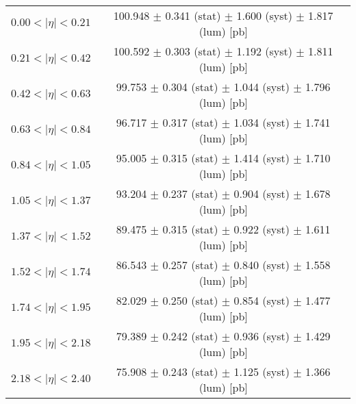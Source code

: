 \begin{tabular}{lc}
\hline
$0.00 < |\eta| <0.21$          & 100.948 $\pm$ 0.341 (stat) $\pm$ 1.600 (syst) $\pm$ 1.817 (lum) [pb]  \\
$0.21 < |\eta| <0.42$          & 100.592 $\pm$ 0.303 (stat) $\pm$ 1.192 (syst) $\pm$ 1.811 (lum) [pb]  \\
$0.42 < |\eta| <0.63$          & 99.753 $\pm$ 0.304 (stat) $\pm$ 1.044 (syst) $\pm$ 1.796 (lum) [pb]  \\
$0.63 < |\eta| <0.84$          & 96.717 $\pm$ 0.317 (stat) $\pm$ 1.034 (syst) $\pm$ 1.741 (lum) [pb]  \\
$0.84 < |\eta| <1.05$          & 95.005 $\pm$ 0.315 (stat) $\pm$ 1.414 (syst) $\pm$ 1.710 (lum) [pb]  \\
$1.05 < |\eta| <1.37$          & 93.204 $\pm$ 0.237 (stat) $\pm$ 0.904 (syst) $\pm$ 1.678 (lum) [pb]  \\
$1.37 < |\eta| <1.52$          & 89.475 $\pm$ 0.315 (stat) $\pm$ 0.922 (syst) $\pm$ 1.611 (lum) [pb]  \\
$1.52 < |\eta| <1.74$          & 86.543 $\pm$ 0.257 (stat) $\pm$ 0.840 (syst) $\pm$ 1.558 (lum) [pb]  \\
$1.74 < |\eta| <1.95$          & 82.029 $\pm$ 0.250 (stat) $\pm$ 0.854 (syst) $\pm$ 1.477 (lum) [pb]  \\
$1.95 < |\eta| <2.18$          & 79.389 $\pm$ 0.242 (stat) $\pm$ 0.936 (syst) $\pm$ 1.429 (lum) [pb]  \\
$2.18 < |\eta| <2.40$          & 75.908 $\pm$ 0.243 (stat) $\pm$ 1.125 (syst) $\pm$ 1.366 (lum) [pb]  \\
\hline
\end{tabular}
